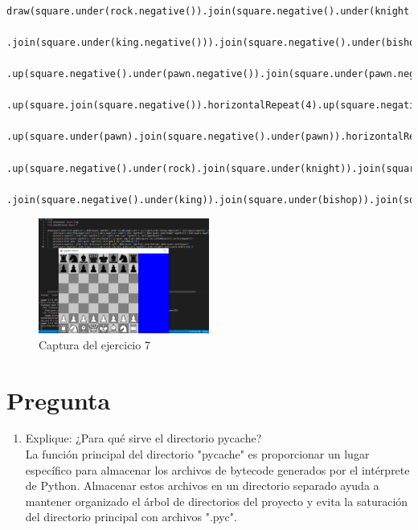 \documentclass{article}
\begin{document}
\begin{itemize}
\begin{lstlisting}
	draw(square.under(rock.negative()).join(square.negative().under(knight.negative())).join(square.under(bishop.negative())).join(square.negative().under(queen.negative()))
	.join(square.under(king.negative())).join(square.negative().under(bishop.negative())).join(square.under(knight.negative())).join(square.negative().under(rock.negative()))
	.up(square.negative().under(pawn.negative()).join(square.under(pawn.negative())).horizontalRepeat(4))
	.up(square.join(square.negative()).horizontalRepeat(4).up(square.negative().join(square).horizontalRepeat(4)).verticalRepeat(2))
	.up(square.under(pawn).join(square.negative().under(pawn)).horizontalRepeat(4))
	.up(square.negative().under(rock).join(square.under(knight)).join(square.negative().under(bishop)).join(square.under(queen))
	.join(square.negative().under(king)).join(square.under(bishop)).join(square.negative().under(knight)).join(square.under(rock))))
		\end{lstlisting}
		\begin{figure}[h]
			\centering
			\includegraphics[width=0.5\textwidth]{Imagenes/4e7.png}
			\caption{Captura del ejercicio 7}
		\end{figure}
	\end{itemize}
	
	\section*{Pregunta}
	\begin{enumerate}
		\item Explique: ¿Para qué sirve el directorio pycache?
		\\La función principal del directorio "pycache" es proporcionar un lugar específico para almacenar los archivos de bytecode generados por el intérprete de Python. Almacenar estos archivos en un directorio separado ayuda a mantener organizado el árbol de directorios del proyecto y evita la saturación del directorio principal con archivos ".pyc".
	\end{enumerate}
	
\end{document}
